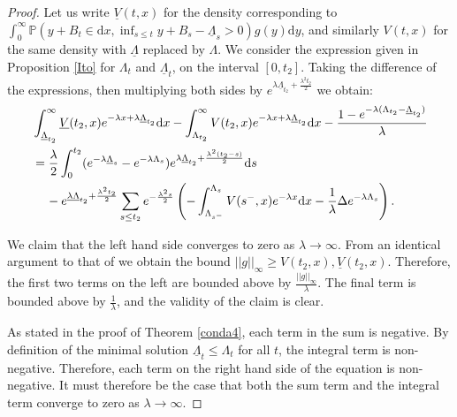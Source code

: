 \documentclass[11pt]{article}
\theoremstyle{plain}
\theoremstyle{remark}
\theoremstyle{definition}
\numberwithin{equation}{section}
\begin{document}
\begin{proof}
Let us write $\underline{V}(t,x)$ for the density corresponding to $\int_0^\infty \mathbb{P}(y+B_t\in \textrm{d}x,\inf_{s\leq t}y+B_s-\underline{\Lambda}_s>0)g(y)\textrm{d}y$, and similarly $V(t,x)$ for the same density with $\underline{\Lambda}$ replaced by $\Lambda$.
We consider the expression given in Proposition \ref{Ito} for $\Lambda_t$ and $\underline{\Lambda}_t$, on the interval $[0,t_2]$.
Taking the difference of the expressions, then multiplying both sides by $e^{\lambda \underline{\Lambda}_{t_2}+\frac{\lambda^2t_2}{2}}$ we obtain:
\begin{align*}
    &\int_{\underline{\Lambda}_{t_2}}^\infty \underline{V}(t_2,x)e^{-\lambda x+\lambda \underline{\Lambda}_{t_2}}\textrm{d}x-\int_{\Lambda_{t_2}}^\infty V(t_2,x)e^{-\lambda x+\lambda\underline{\Lambda}_{t_2}}\textrm{d}x-\frac{1-e^{-\lambda(\Lambda_{t_2}-\underline{\Lambda}_{t_2})}}{\lambda}\\
    &=\frac{\lambda}{2}\int_0^{t_2}(e^{-\lambda \underline{\Lambda}_s}-e^{-\lambda \Lambda_{s}})e^{\lambda \underline{\Lambda}_{t_2}+\frac{\lambda^2(t_2-s)}{2}}\textrm{d}s\\
    &\hspace{0.4cm}-e^{\underline{\lambda\Lambda}_{t_2}+\frac{\lambda^2t_2}{2}}\sum_{s\leq t_2}e^{-\frac{\lambda^2s}{2}}\left(-\int_{\Lambda_{s^-}}^{\Lambda_s} V(s^-,x)e^{-\lambda x}\textrm{d}x-\frac{1}{\lambda}\Delta e^{-\lambda\Lambda_s}\right).
\end{align*}

We claim that the left hand side converges to zero as $\lambda\rightarrow\infty$. From an identical argument to that of \cite[Lemma 2.1]{2} we obtain the bound $||g||_\infty\geq V(t_2,x),\underline{V}(t_2,x)$. Therefore, the first two terms on the left are bounded above by $\frac{||g||_\infty}{\lambda}$. The final term is bounded above by $\frac{1}{\lambda}$, and the validity of the claim is clear.

As stated in the proof of Theorem \ref{conda4}, each term in the sum is negative. By definition of the minimal solution $\underline{\Lambda}_t\leq \Lambda_t$ for all $t$, the integral term is non-negative. Therefore, each term on the right hand side of the equation is non-negative. It must therefore be the case that both the sum term and the integral term converge to zero as $\lambda \rightarrow \infty$.


\end{proof}
\end{document}
